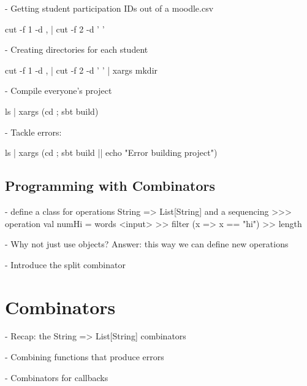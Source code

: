 \documentclass[9pt]{extbook}
\begin{document}
  - Getting student participation IDs out of a moodle.csv

    cut -f 1 -d , | cut -f 2 -d ' '

  - Creating directories for each student

    cut -f 1 -d , | cut -f 2 -d ' ' | xargs mkdir

  - Compile everyone's project

    ls | xargs (cd {}; sbt build)

  - Tackle errors:

    ls | xargs (cd {}; sbt build || echo "Error building project")

\section{Programming with Combinators}

- define a class for operations String => List[String] and a
  sequencing >>> operation
  val numHi = words <input> >> filter (x => x == "hi") >> length

- Why not just use objects? Answer: this way we can define new operations

- Introduce the split combinator

\chapter{Combinators}

- Recap: the String => List[String] combinators

- Combining functions that produce errors

- Combinators for callbacks





























\end{document}
